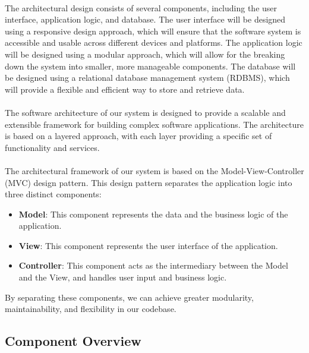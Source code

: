 \documentclass{article}
\begin{document}
\paragraph*{}
The architectural design consists of several components, including the user interface, application logic, and database. The user interface will be designed using a responsive design approach, which will ensure that the software system is accessible and usable across different devices and platforms. The application logic will be designed using a modular approach, which  will allow for the breaking down the system into smaller, more manageable components. The database will be designed using a relational database management system (RDBMS), which will provide a flexible and efficient way to store and retrieve data.

\paragraph*{}
The software architecture of our system is designed to provide a scalable and extensible framework for building complex software applications. The architecture is based on a layered approach, with each layer providing a specific set of functionality and services.

\paragraph*{}
The architectural framework of our system is based on the Model-View-Controller (MVC) design pattern. This design pattern separates the application logic into three distinct components:

\begin{itemize}
\item \textbf{Model}: This component represents the data and the business logic of the application.
\item \textbf{View}: This component represents the user interface of the application.
\item \textbf{Controller}: This component acts as the intermediary between the Model and the View, and handles user input and business logic.
\end{itemize}

By separating these components, we can achieve greater modularity, maintainability, and flexibility in our codebase.

\subsection{Component Overview}
\end{document}
